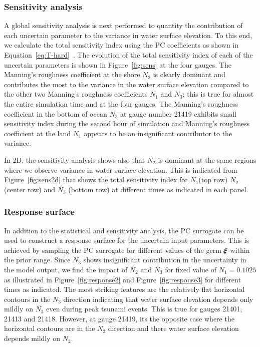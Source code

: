 \subsubsection{Sensitivity analysis}
A global sensitivity analysis is next performed to quantity the contribution of each
uncertain parameter to the variance in water surface elevation. To this end, we calculate 
the total sensitivity index using the PC coefficients as shown in Equation~\eqref{eq:T-hard}~\citep{Alexanderian2012,Sudret,Crestaux}. The evolution of the total sensitivity index
of each of the uncertain parameters is shown in Figure~\ref{fig:sens} at the four gauges. 
The Manning's roughness coefficient at the shore $N_2$ is clearly dominant and contributes
the most to the variance in the water surface elevation compared to the other two 
Manning's roughness coefficients $N_1$ and $N_3$; this is true for almost the entire simulation time
and at the four gauges. The Manning's roughness coefficient
in the bottom of ocean $N_{3}$ at gauge number 21419 exhibits small sensitivity index 
during the second hour of simulation and Manning's roughness coefficient
at the land $N_1$ appears to be an insignificant contributor
to the variance.

In 2D, the sensitivity analysis shows also that $N_2$ is dominant
at the same regions where we observe variance in water surface elevation. This is
indicated from Figure~\ref{fig:sens2d} that shows the total sensitivity index
for $N_1$(top row) $N_2$(center row) and $N_3$ (bottom row)
at different times as indicated in each panel.

\subsubsection{Response surface}
In addition to the statistical and sensitivity analysis, the PC surrogate 
can be used to construct a response surface for the uncertain input parameters.
This is achieved by sampling the PC surrogate for different values of the germ $\xxi$ within the prior
range. Since $N_3$ shows insignificant contribution in the 
uncertainty in the model output, we find the impact of $N_2$ and $N_3$ for 
fixed value of $N_1=0.1025$ as illustrated in Figure~\ref{fig:response2}
and Figure~\ref{fig:response3} for different times as indicated. The most striking features are the relatively flat
horizontal contours in the $N_3$ direction indicating that water surface elevation depends
only mildly on $N_3$ even during peak tsunami events. This is true for gauges 21401, 21413 and 21418. However,
at gauge 21419, its the opposite case where the horizontal contours are in the $N_2 $ direction
and there water surface elevation depends mildly on $N_2$.
